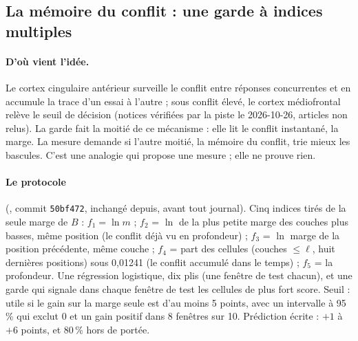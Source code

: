 \subsection{La mémoire du conflit : une garde à indices multiples}\label{t3tro:sec:indices}

\paragraph{D'où vient l'idée.} Le cortex cingulaire antérieur surveille le conflit entre réponses concurrentes et en accumule la trace d'un essai à l'autre \cite{botvinick2001conflict} ; sous conflit élevé, le cortex médiofrontal relève le seuil de décision \cite{cavanagh2011subthalamic} (notices vérifiées par la piste le 2026-10-26, articles non relus). La garde fait la moitié de ce mécanisme : elle lit le conflit instantané, la marge. La mesure demande si l'autre moitié, la mémoire du conflit, trie mieux les bascules. C'est une analogie qui propose une mesure ; elle ne prouve rien.

\paragraph{Le protocole} (, commit \texttt{50bf472}, inchangé depuis, avant tout journal). Cinq indices tirés de la seule marge de $B$ : $f_1 = \ln m$ ; $f_2$ = $\ln$ de la plus petite marge des couches plus basses, même position (le conflit déjà vu en profondeur) ; $f_3$ = $\ln$ marge de la position précédente, même couche ; $f_4$ = part des cellules (couches $\le \ell$, huit dernières positions) sous 0,01241 (le conflit accumulé dans le temps) ; $f_5$ = la profondeur. Une régression logistique, dix plis (une fenêtre de test chacun), et une garde qui signale dans chaque fenêtre de test les cellules de plus fort score. Seuil : utile si le gain sur la marge seule est d'au moins 5 points, avec un intervalle à 95\,\% qui exclut 0 et un gain positif dans 8 fenêtres sur 10. Prédiction écrite : $+1$ à $+6$ points, et 80\,\% hors de portée.

